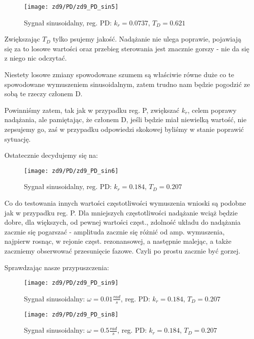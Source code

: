 \documentclass[11 pt]{article}
\begin{document}
\begin{figure}[h!]
	\centerline{
	\texttt{[image: zd9/PD/zd9\_PD\_sin5]}
	}
	\caption{Sygnał sinusoidalny, reg. PD: $k_r = 0.0737$, $T_D = 0.621$}
\end{figure}

Zwiększając $T_D$ tylko psujemy jakość. Nadążanie nie ulega poprawie, pojawiają się za to losowe wartości oraz przebieg sterowania jest znacznie gorszy - nie da się z niego nic odczytać.

Niestety losowe zmiany spowodowane szumem są właściwie równe duże co te spowodowane wymuszeniem sinusoidalnym, zatem trudno nam będzie pogodzić ze sobą te rzeczy członem D.

Powinniśmy zatem, tak jak w przypadku reg. P, zwiększać $k_r$, celem poprawy nadążania, ale pamiętając, że członem D, jeśli będzie miał niewielką wartość, nie zepsujemy go, zaś w przypadku odpowiedzi skokowej byliśmy w stanie poprawić sytuację.

\newpage

Ostatecznie decydujemy się na:

\begin{figure}[h!]
	\centerline{
	\texttt{[image: zd9/PD/zd9\_PD\_sin6]}
	}
	\caption{Sygnał sinusoidalny, reg. PD: $k_r = 0.184$, $T_D = 0.207$}
\end{figure}

Co do testowania innych wartości częstotliwości wymuszenia wnioski są podobne jak w przypadku reg. P. Dla mniejszych częstotliwości nadążanie wciąż będzie dobre, dla większych, od pewnej wartości częst., zdolność układu do nadążania zacznie się pogarszać - amplituda zacznie się różnić od amp. wymuszenia, najpierw rosnąc, w rejonie częst. rezonansowej, a następnie malejąc, a także zaczniemy obserwować przesunięcie fazowe. Czyli po prostu zacznie być gorzej.

Sprawdzając nasze przypuszczenia:

\begin{figure}[h!]
	\centerline{
	\texttt{[image: zd9/PD/zd9\_PD\_sin9]}
	}
	\caption{Sygnał sinusoidalny: $\omega = 0.01 \frac{rad}{s}$, reg. PD: $k_r = 0.184$, $T_D = 0.207$}
\end{figure}

\newpage

\begin{figure}[h!]
	\centerline{
	\texttt{[image: zd9/PD/zd9\_PD\_sin8]}
	}
	\caption{Sygnał sinusoidalny: $\omega = 0.5 \frac{rad}{s}$, reg. PD: $k_r = 0.184$, $T_D = 0.207$}
\end{figure}
\end{document}
